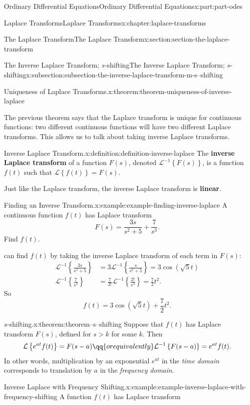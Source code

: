 \documentclass[twoside,10pt,]{book}
\newcommand{\terminology}[1]{\textbf{#1}}
\numberwithin{equation}{part}
\newcommand{\Laplace}[1]{\mathcal{L}\left\{#1\right\}}
\newcommand{\iLaplace}[1]{\mathcal{L}^{-1}\left\{#1\right\}}
\newcommand{\gt}{>}
\newcommand{\amp}{&}
\begin{document}
\begin{partptx}{Ordinary Differential Equations}{}{Ordinary Differential Equations}{}{}{x:part:part-odes}
\begin{chapterptx}{Laplace Transforms}{}{Laplace Transforms}{}{}{x:chapter:laplace-transforms}
\begin{sectionptx}{The Laplace Transform}{}{The Laplace Transform}{}{}{x:section:section-the-laplace-transform}
\begin{subsectionptx}{The Inverse Laplace Transform; \(s\)-shifting}{}{The Inverse Laplace Transform; \(s\)-shifting}{}{}{x:subsection:subsection-the-inverse-laplace-transform-m-s--shifting}
\begin{theorem}{Uniqueness of Laplace Transforms.}{}{x:theorem:theorem-uniqueness-of-inverse-laplace}
\end{theorem}
The previous theorem says that the Laplace transform is unique for continuous functions: two different continuous functions will have two different Laplace transforms. This allows us to talk about taking inverse Laplace transforms.%
\begin{definition}{Inverse Laplace Transform.}{x:definition:definition-inverse-laplace}%
The \terminology{inverse Laplace transform} of a function \(F(s)\), denoted \(\mathcal{L}^{-1}\left\{F(s)\right\}\), is a function \(f(t)\) such that \(\Laplace{f(t)} = F(s)\).%
\end{definition}
Just like the Laplace transform, the inverse Laplace transform is \terminology{linear}.%
\begin{example}{Finding an Inverse Transform.}{x:example:example-finding-inverse-laplace}%
A continuous function \(f(t)\) has Laplace transform%
\begin{equation*}
F(s) = \frac{3s}{s^{2}+5} + \frac{7}{s^{3}}.
\end{equation*}
Find \(f(t)\).%
\par\smallskip%
\noindentWe can find \(f(t)\) by taking the inverse Laplace transform of each term in \(F(s)\):%
\begin{align*}
\iLaplace{\frac{3s}{s^{2}+5}} \amp= 3\iLaplace{\frac{s}{s^{2}+5}} = 3\cos(\sqrt{5}t)\\
\iLaplace{\frac{7}{s^{3}}} \amp= \frac{7}{2!}\iLaplace{\frac{2!}{s^{3}}} = \frac{7}{2}t^{2}\text{.}
\end{align*}
So%
\begin{equation*}
f(t) = 3\cos(\sqrt{5}t)+\frac{7}{2}t^{2}.
\end{equation*}
%
\end{example}
\begin{theorem}{\(s\)-shifting.}{}{x:theorem:theorem--s--shifting}%
Suppose that \(f(t)\) has Laplace transform \(F(s)\), defined for \(s\gt k\) for some \(k\). Then%
\begin{equation*}
\Laplace{e^{at}f(t)} = F(s-a)\qq{or equivalently} \iLaplace{F(s-a)} = e^{at}f(t).
\end{equation*}
In other words, multiplication by an exponential \(e^{at}\) in the \emph{time domain} corresponds to translation by \(a\) in the \emph{frequency domain}.%
\end{theorem}
\begin{example}{Inverse Laplace with Frequency Shifting.}{x:example:example-inverse-laplace-with-frequency-shifting}%
A function \(f(t)\) has Laplace transform%

\end{example}
\end{subsectionptx}
\end{sectionptx}
\end{chapterptx}
\end{partptx}
\end{document}
